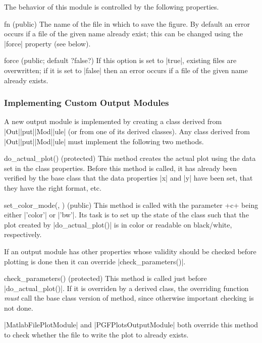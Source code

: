 The behavior of this module is controlled by the following properties.
\begin{property}{fn (public)}
  The name of the file in which to save the figure. By
  default an error occurs if a file of the given name already exist; this can
  be changed using the |force| property (see below).
\end{property}

\begin{property}{force (public; default ?false?)}
   If this option is set to |true|, existing files are
  overwritten; if it is set to |false| then an error occurs if a file of the
  given name already exists.
\end{property}


\subsubsection{Implementing Custom Output Modules}

A new output module is implemented by creating a class derived from
|Out|\-|put|\-|Mod|\-|ule| (or from one of its derived classes). Any class
derived from |Out|\-|put|\-|Mod|\-|ule| must implement the following two methods.

\begin{method}{do_actual_plot(\obj) (protected)}
  This method creates the actual plot using the data set in the class
  properties. Before this method is called, it has already been verified by the
  base class that the data properties |x| and |y| have been set, that they have
  the right format, etc. 
\end{method}

\begin{method}{set_color_mode(\obj, ) (public)}
  This method is called with the parameter +c+ being either |'color'| or |'bw'|.
  Its task is to set up the state of the class such that the plot created by
  |do_actual_plot()| is in color or readable on black/white, respectively.
\end{method}

If an output module has other properties whose validity should be checked before
plotting is done then it can override |check_parameters()|.

\begin{method}{check_parameters(\obj) (protected)}
  This method is called just before |do_actual_plot()|. If it is overriden by a
  derived class, the overriding function \emph{must} call the base class version
  of method, since otherwise important checking is not done. 

  \codeexample |MatlabFilePlotModule| and |PGFPlotsOutputModule| both override
  this method to check whether the file to write the plot to already exists.
\end{method}

